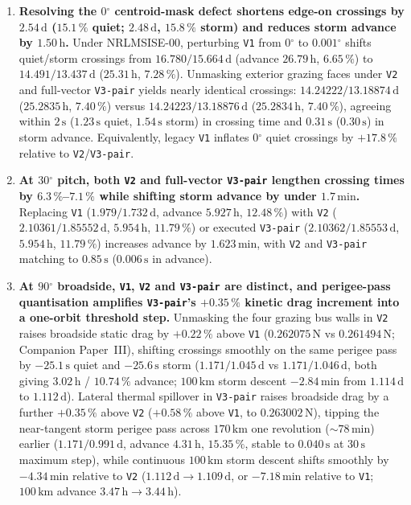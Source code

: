\documentclass[12pt]{article}
\newcommand{\unit}[1]{\,\mathrm{#1}}
\newcommand{\degree}{\ensuremath{{}^\circ}}
\begin{document}
\begin{enumerate}
\item \textbf{Resolving the $0\degree$ centroid-mask defect shortens edge-on crossings by $2.54\unit{d}$ ($15.1\,\%$ quiet; $2.48\unit{d}$, $15.8\,\%$ storm) and reduces storm advance by $1.50\unit{h}$.} Under NRLMSISE-00, perturbing \texttt{V1} from $0\degree$ to $0.001\degree$ shifts quiet/storm crossings from $16.780/15.664\unit{d}$ (advance $26.79\unit{h}$, $6.65\,\%$) to $14.491/13.437\unit{d}$ ($25.31\unit{h}$, $7.28\,\%$). Unmasking exterior grazing faces under \texttt{V2} and full-vector \texttt{V3-pair} yields nearly identical crossings: $14.24222/13.18874\unit{d}$ ($25.2835\unit{h}$, $7.40\,\%$) versus $14.24223/13.18876\unit{d}$ ($25.2834\unit{h}$, $7.40\,\%$), agreeing within $2\unit{s}$ ($1.23\unit{s}$ quiet, $1.54\unit{s}$ storm) in crossing time and $0.31\unit{s}$ ($0.30\unit{s}$) in storm advance. Equivalently, legacy \texttt{V1} inflates $0\degree$ quiet crossings by $+17.8\,\%$ relative to \texttt{V2}/\texttt{V3-pair}.

\item \textbf{At $30\degree$ pitch, both \texttt{V2} and full-vector \texttt{V3-pair} lengthen crossing times by $6.3\,\%$--$7.1\,\%$ while shifting storm advance by under $1.7\unit{min}$.} Replacing \texttt{V1} ($1.979/1.732\unit{d}$, advance $5.927\unit{h}$, $12.48\,\%$) with \texttt{V2} ($2.10361/1.85552\unit{d}$, $5.954\unit{h}$, $11.79\,\%$) or executed \texttt{V3-pair} ($2.10362/1.85553\unit{d}$, $5.954\unit{h}$, $11.79\,\%$) increases advance by $1.623\unit{min}$, with \texttt{V2} and \texttt{V3-pair} matching to $0.85\unit{s}$ ($0.006\unit{s}$ in advance).

\item \textbf{At $90\degree$ broadside, \texttt{V1}, \texttt{V2} and \texttt{V3-pair} are distinct, and perigee-pass quantisation amplifies \texttt{V3-pair}'s $+0.35\,\%$ kinetic drag increment into a one-orbit threshold step.} Unmasking the four grazing bus walls in \texttt{V2} raises broadside static drag by $+0.22\,\%$ above \texttt{V1} ($0.262075\unit{N}$ vs $0.261494\unit{N}$; Companion Paper~III), shifting crossings smoothly on the same perigee pass by $-25.1\unit{s}$ quiet and $-25.6\unit{s}$ storm ($1.171/1.045\unit{d}$ vs $1.171/1.046\unit{d}$, both giving $3.02\unit{h}$ / $10.74\,\%$ advance; $100\unit{km}$ storm descent $-2.84\unit{min}$ from $1.114\unit{d}$ to $1.112\unit{d}$). Lateral thermal spillover in \texttt{V3-pair} raises broadside drag by a further $+0.35\,\%$ above \texttt{V2} ($+0.58\,\%$ above \texttt{V1}, to $0.263002\unit{N}$), tipping the near-tangent storm perigee pass across $170\unit{km}$ one revolution ($\sim78\unit{min}$) earlier ($1.171/0.991\unit{d}$, advance $4.31\unit{h}$, $15.35\,\%$, stable to $0.040\unit{s}$ at $30\unit{s}$ maximum step), while continuous $100\unit{km}$ storm descent shifts smoothly by $-4.34\unit{min}$ relative to \texttt{V2} ($1.112\unit{d} \to 1.109\unit{d}$, or $-7.18\unit{min}$ relative to \texttt{V1}; $100\unit{km}$ advance $3.47\unit{h} \to 3.44\unit{h}$).


\end{enumerate}
\end{document}
